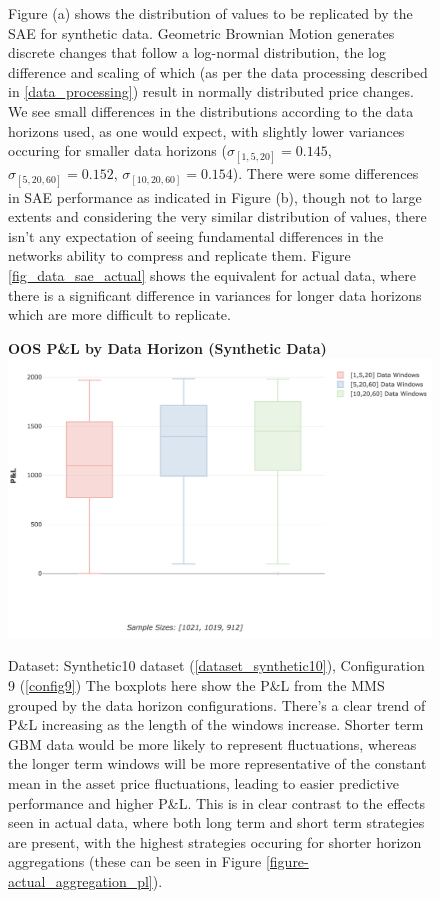 \documentclass[a4paper,11pt,oneside]{article}
\theoremstyle{plain}
\theoremstyle{definition}
\begin{document}
\begin{figure}[H]
{			\newline Figure (a) shows the distribution of values to be replicated by the SAE for synthetic data. Geometric Brownian Motion generates discrete changes that follow a log-normal distribution, the log difference and scaling of which (as per the data processing described in \ref{data_processing}) result in normally distributed price changes. We see small differences in the distributions according to the data horizons used, as one would expect, with slightly lower variances occuring for smaller data horizons ($\sigma_{[1,5,20]} = 0.145$, $\sigma_{[5,20,60]} = 0.152$, $\sigma_{[10,20,60]} = 0.154$). There were some differences in SAE performance as indicated in Figure (b), though not to large extents and considering the very similar distribution of values, there isn't any expectation of seeing fundamental differences in the networks ability to compress and replicate them. 
			\newline Figure \ref{fig_data_sae_actual} shows the equivalent for actual data, where there is a significant difference in variances for longer data horizons which are more difficult to replicate.}
		\label{figure-data_sae_synthetic}
	\end{figure}
	
	
	
	\begin{figure}[H]
		\centering 
		\textbf{OOS P\&L by Data Horizon (Synthetic Data)}
		\includegraphics[scale=0.3]{images/results/data/test_aggregation_pl.png}
		\caption[OOS P\&L by Data Aggregation (Synthetic Data)]{
			Dataset: Synthetic10 dataset (\ref{dataset_synthetic10}), Configuration 9 (\ref{config9})
			\newline  The boxplots here show the P\&L from the MMS grouped by the data horizon configurations. There's a clear trend of P\&L increasing as the length of the windows increase. Shorter term GBM data would be more likely to represent fluctuations, whereas the longer term windows will be more representative of the constant mean in the asset price fluctuations, leading to easier predictive performance and higher P\&L. This is in clear contrast to the effects seen in actual data, where both long term and short term strategies are present, with the highest strategies occuring for shorter horizon aggregations (these can be seen in Figure \ref{figure-actual_aggregation_pl}).}
		\label{figure-test_aggregation_pl}
	\end{figure}
	
\end{document}
